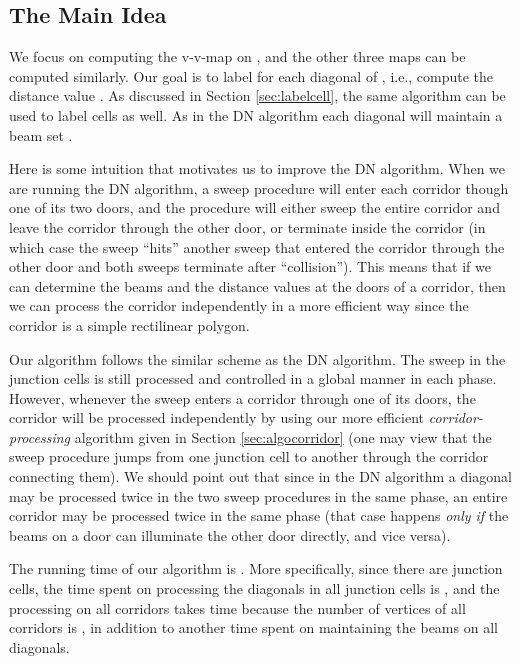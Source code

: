 \documentclass[english,runningheads,11pt]{llncs-revised}
\begin{document}
\subsection{The Main Idea}
\label{sec:main}

We focus on computing the v-v-map on , and
the other three maps can be computed similarly.
Our goal is to label  for each diagonal  of , i.e., compute the
distance value .
As discussed in Section \ref{sec:labelcell}, the same algorithm
can be used to label cells as well. As in the DN algorithm
each diagonal  will maintain a beam set .




Here is some intuition that motivates us to improve the DN algorithm.
When we are running the DN algorithm, a sweep
procedure will enter each corridor though one of its two doors, and the
procedure will either sweep the entire corridor and leave the corridor
through the other door, or terminate inside the corridor (in which case
the sweep ``hits'' another sweep that entered the corridor through the
other door and both sweeps terminate after ``collision'').  This means that if we can
determine the beams and the distance values at the doors of a corridor,
then we can process the corridor independently in a more efficient way since
the corridor is a simple rectilinear polygon.


Our algorithm follows the similar scheme as the DN algorithm. The
sweep in the junction cells is still processed and
controlled in a global manner in each phase.
However, whenever the sweep enters a corridor through one of its doors, the corridor will
be processed independently by using our more efficient {\em
corridor-processing} algorithm given in Section \ref{sec:algocorridor}
(one may view that the sweep procedure jumps from one junction cell to
another through the corridor connecting them).
We should point out that since
in the DN algorithm a diagonal may be processed twice in the two
sweep procedures in the same phase, an entire corridor may be processed twice in
the same phase (that case happens {\em only if} the beams on a door
can illuminate the other door directly, and vice versa).

The running time of our algorithm is . More specifically, since
there are  junction cells, the time spent on processing the
diagonals in all
junction cells is , and the processing on all corridors
takes  time because the number of vertices of all
corridors is , in addition to another  time spent on
maintaining the beams on all diagonals.
\end{document}
